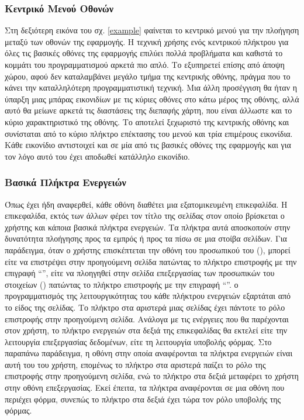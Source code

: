 \subsubsection{Κεντρικό Μενού Οθονών}
Στη δεξιότερη εικόνα του σχ. \ref{example} φαίνεται το κεντρικό μενού για την πλοήγηση μεταξύ των οθονών της εφαρμογής. Η τεχνική χρήσης ενός κεντρικού πλήκτρου για όλες τις βασικές οθόνες της εφαρμογής επιλύει πολλά προβλήματα και καθιστά το κομμάτι του προγραμματισμού αρκετά πιο απλό. Το  εξυπηρετεί επίσης από άποψη χώρου, αφού δεν καταλαμβάνει μεγάλο τμήμα της  κεντρικής οθόνης, πράγμα που το κάνει την καταλληλότερη προγραμματιστική τεχνική. Μια άλλη προσέγγιση θα ήταν η ύπαρξη μιας μπάρας εικονιδίων με τις κύριες οθόνες στο κάτω μέρος της οθόνης, αλλά αυτό θα μείωνε αρκετά τις διαστάσεις της διεπαφής χάρτη, που είναι άλλωστε και το κύριο χαρακτηριστικό της οθόνης.
\newline
\indent
Το  αποτελεί ξεχωριστό  της κεντρικής οθόνης και συνίσταται από το κύριο πλήκτρο επέκτασης του μενού και τρία επιμέρους εικονίδια. Κάθε εικονίδιο αντιστοιχεί και σε μία από τις βασικές οθόνες της εφαρμογής και για τον λόγο αυτό του έχει αποδωθεί κατάλληλο εικονίδιο.


\subsubsection{Βασικά Πλήκτρα Ενεργειών}
Όπως έχει ήδη αναφερθεί, κάθε οθόνη διαθέτει μια εξατομικευμένη επικεφαλίδα. Η επικεφαλίδα, εκτός των άλλων φέρει τον τίτλο της σελίδας στον οποίο βρίσκεται ο χρήστης και κάποια βασικά πλήκτρα ενεργειών. Τα πλήκτρα αυτά αποσκοπούν στην δυνατότητα πλοήγησης προς τα εμπρός ή προς τα πίσω σε μια στοίβα σελίδων. Για παράδειγμα, όταν ο χρήστης επισκέπτεται την οθόνη του προσωπικού του  (), μπορεί είτε να επιστρέψει στην προηγούμενη σελίδα πατώντας το πλήκτρο επιστροφής με την επιγραφή ``\textit{}'', είτε να πλοηγηθεί στην σελίδα επεξεργασίας των προσωπικών του στοιχείων () πατώντας το πλήκτρο επιστροφής με την επιγραφή ``\textit{}''.
\newline
\indent
ο προγραμματισμός της λειτουργικότητας του κάθε πλήκτρου ενεργειών εξαρτάται από το είδος της σελίδας. Το πλήκτρο στα αριστερά μιας σελίδας έχει πάντοτε το ρόλο επιστροφής στην προηγούμενη σελίδα. Ανάλογα με τις ενέργειες που θα παρέχονται στον χρήστη, το πλήκτρο ενεργειών στα δεξιά της επικεφαλίδας θα εκτελεί είτε την λειτουργία επεξεργασίας δεδομένων, είτε τη λειτουργία υποβολής φόρμας. Στο παραπάνω παράδειγμα, η οθόνη στην οποία αναφέρονται τα πλήκτρα ενεργειών είναι αυτή του  του χρήστη, επομένως το πλήκτρο στα αριστερά παίζει το ρόλο της επιστροφής στην προηγούμενη σελίδα, ενώ το πλήκτρο στα δεξιά μεταφέρει το χρήστη στην οθόνη επεξεργασίας. Εκεί έπειτα, τα πλήκτρα αναφέρονται σε μια οθόνη που περιέχει φόρμα, συνεπώς το πλήκτρο στα δεξιά έχει τώρα τον ρόλο υποβολής της φόρμας. 

